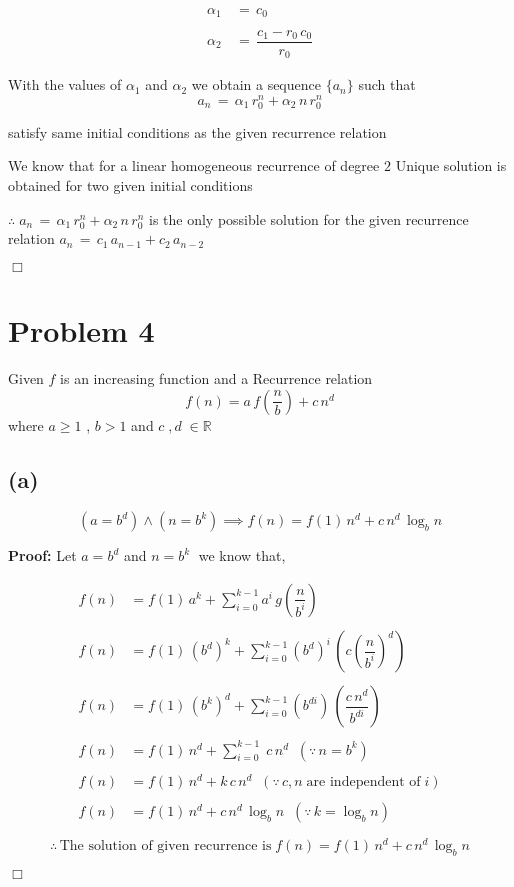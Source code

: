 \documentclass{article}
\newcommand{\qed}{\hfill \ensuremath{\Box}}
\begin{document}
\newpage

\begin{align*}
    \alpha_1\,&=\,c_0 \\ \\
    \alpha_2\,&=\,\dfrac{c_1-r_0\,c_0}{r_0}
\end{align*}
\null \par
\noindent With the values of $\alpha_1$ and $\alpha_2$ we obtain a sequence $\{a_n\}$ such that
$$a_n\,=\,\alpha_1\,r_{0}^{n}+\alpha_2\,n\,r_{0}^{n}$$
\null \par
\noindent satisfy same initial conditions as the given recurrence relation 
\null \par \null
\noindent We know that for a linear homogeneous recurrence of degree $2$ Unique solution 
is obtained for two given initial conditions 
\null \par \null
\noindent $\therefore\;a_n\,=\,\alpha_1\,r_{0}^{n}+\alpha_2\,n\,r_{0}^{n}$ is the only possible 
solution for the given recurrence relation 
$a_n\,=\,c_1\,a_{n-1} + c_2\,a_{n-2}\;$
\null \par \null
\qed

\newpage
\section*{Problem 4}
Given $f$ is an increasing function and a Recurrence relation 
                 \[f(n) = a\,f\left(\dfrac{n}{b}\right) +c\,n^d \]
where $a\geq1$ , $b>1$ and $c\;,d\;\in \mathbb{R}$

\subsection*{(a)}
$$(a=b^d) \land (n=b^k) \implies f(n)=f(1)\,n^d + c\,n^d\,\log_b n$$
\null\par
\textbf{Proof:} Let $a=b^d$ and $n=b^k\;$ we know that,

\begin{align*}
f(n)&=f(1)\,a^k+\displaystyle\sum_{i=0}^{k-1}a^i\,g\left(\dfrac{n}{b^i}\right) \\ \\
f(n)&=f(1)\,(b^d)^{k}+\displaystyle\sum_{i=0}^{k-1}(b^d)^{i}\,
\left(c\left(\dfrac{n}{b^i}\right)^{d}\right) \\ \\ 
f(n)&=f(1)\,(b^k)^{d}+\displaystyle\sum_{i=0}^{k-1}(b^{di})\,
\left(\dfrac{c\,n^d}{b^{di}}\right) \\ \\ 
f(n)&=f(1)\,n^{d}+\displaystyle\sum_{i=0}^{k-1}\;c\,n^d\;\;(\because\,n=b^k) \\ \\ 
f(n)&=f(1)\,n^{d}+k\,c\,n^d\;\;(\because\,c,n\;\text{are independent of}\;i)\\ \\ 
f(n)&=f(1)\,n^{d}+c\,n^d\,\log_b n\;\;(\because\,k=\log_b n)\\ \\ 
\end{align*}
$$\therefore\,\text{The solution of given recurrence is}\;f(n)=f(1)\,n^{d}+c\,n^d\,\log_b n$$
\null \par
\qed
\end{document}
